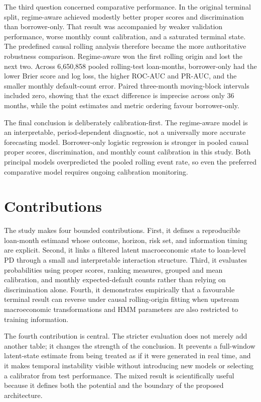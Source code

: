 The third question concerned comparative performance. In the original terminal split, regime-aware achieved modestly better proper scores and discrimination than borrower-only. That result was accompanied by weaker validation performance, worse monthly count calibration, and a saturated terminal state. The predefined causal rolling analysis therefore became the more authoritative robustness comparison. Regime-aware won the first rolling origin and lost the next two. Across 6,650,858 pooled rolling-test loan-months, borrower-only had the lower Brier score and log loss, the higher ROC-AUC and PR-AUC, and the smaller monthly default-count error. Paired three-month moving-block intervals included zero, showing that the exact difference is imprecise across only 36 months, while the point estimates and metric ordering favour borrower-only.

The final conclusion is deliberately calibration-first. The regime-aware model is an interpretable, period-dependent diagnostic, not a universally more accurate forecasting model. Borrower-only logistic regression is stronger in pooled causal proper scores, discrimination, and monthly count calibration in this study. Both principal models overpredicted the pooled rolling event rate, so even the preferred comparative model requires ongoing calibration monitoring.

\section{Contributions}

The study makes four bounded contributions. First, it defines a reproducible loan-month estimand whose outcome, horizon, risk set, and information timing are explicit. Second, it links a filtered latent macroeconomic state to loan-level PD through a small and interpretable interaction structure. Third, it evaluates probabilities using proper scores, ranking measures, grouped and mean calibration, and monthly expected-default counts rather than relying on discrimination alone. Fourth, it demonstrates empirically that a favourable terminal result can reverse under causal rolling-origin fitting when upstream macroeconomic transformations and HMM parameters are also restricted to training information.

The fourth contribution is central. The stricter evaluation does not merely add another table; it changes the strength of the conclusion. It prevents a full-window latent-state estimate from being treated as if it were generated in real time, and it makes temporal instability visible without introducing new models or selecting a calibrator from test performance. The mixed result is scientifically useful because it defines both the potential and the boundary of the proposed architecture.


